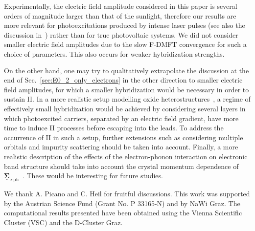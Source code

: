 \documentclass[aps,prb,groupedaddress,showpacs,twocolumn,superscriptaddress,10pt]{revtex4-2}
\newcommand{\mat}[1]{\bm{#1}} %
\newcommand{\kel}[1]{\underline{#1}} %
\newcommand{\resub}[1]{{\color{hblue} #1}}
\begin{document}
Experimentally, the electric field amplitude considered in this paper is several orders of magnitude larger than that of the sunlight, therefore our results are more relevant for photoexcitations produced by intense laser pulses (see also the discussion in~\cite{mu.we.18}) rather than for true photovoltaic systems. \resub{We did not consider smaller electric field amplitudes due to the slow F-DMFT convergence for such a choice of parameters. This also occurs for weaker hybridization strengths.} 
 
On the other hand, one may try to qualitatively extrapolate the discussion at the end of Sec.~\ref{sec:E0_2_only_electrons} in the other direction to smaller electric field amplitudes, for which a smaller hybridization would be necessary in order to sustain II. In a more realistic setup modelling oxide heterostructures~\cite{as.bl.13,pe.be.19}, a regime of effectively small hybridization would be achieved by considering several layers in which photoexcited carriers, separated by an electric field gradient, have more time to induce II processes before escaping into the leads. To address the occurrence of II in such a setup, further extensions such as considering multiple orbitals and impurity scattering should be taken into account. \resub{Finally, a more realistic description of the effects of the electron-phonon interaction on electronic band structure should take into account the crystal momentum dependence of $\kel{\mat{\Sigma}}_{\text{e-ph}}$~\cite{gius.17}.} These would be interesting for future studies.    
   
\acknowledgments  

We thank A. Picano and C. Heil for fruitful discussions. This work was supported by the Austrian Science Fund (Grant No. P 33165-N) and by NaWi Graz. The computational results presented have been obtained using the Vienna Scientific Cluster (VSC) and the D-Cluster Graz.
 
    
 
 
\end{document}
